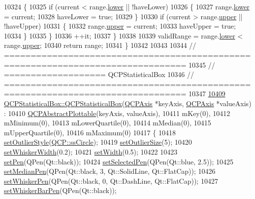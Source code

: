 \begin{DoxyCode}
10324     \{
10325       \textcolor{keywordflow}{if} (current < range.\hyperlink{a00049_aa3aca3edb14f7ca0c85d912647b91745}{lower} || !haveLower)
10326       \{
10327         range.\hyperlink{a00049_aa3aca3edb14f7ca0c85d912647b91745}{lower} = current;
10328         haveLower = \textcolor{keyword}{true};
10329       \}
10330       \textcolor{keywordflow}{if} (current > range.\hyperlink{a00049_ae44eb3aafe1d0e2ed34b499b6d2e074f}{upper} || !haveUpper)
10331       \{
10332         range.\hyperlink{a00049_ae44eb3aafe1d0e2ed34b499b6d2e074f}{upper} = current;
10333         haveUpper = \textcolor{keyword}{true};
10334       \}
10335     \}
10336     ++it;
10337   \}
10338   
10339   validRange = range.\hyperlink{a00049_aa3aca3edb14f7ca0c85d912647b91745}{lower} < range.\hyperlink{a00049_ae44eb3aafe1d0e2ed34b499b6d2e074f}{upper};
10340   \textcolor{keywordflow}{return} range;
10341 \}
10342 
10343 
10344 \textcolor{comment}{// ================================================================================}
10345 \textcolor{comment}{// =================== QCPStatisticalBox}
10346 \textcolor{comment}{// ================================================================================}
10347 
\hypertarget{a00115_source_l10409}{}\hyperlink{a00050_a75c2b3e7fcd0741cc981693a2ba63b27}{10409} \hyperlink{a00050_a75c2b3e7fcd0741cc981693a2ba63b27}{QCPStatisticalBox::QCPStatisticalBox}(\hyperlink{a00025}{QCPAxis} *keyAxis, 
      \hyperlink{a00025}{QCPAxis} *valueAxis) :
10410   \hyperlink{a00024}{QCPAbstractPlottable}(keyAxis, valueAxis),
10411   mKey(0),
10412   mMinimum(0),
10413   mLowerQuartile(0),
10414   mMedian(0),
10415   mUpperQuartile(0),
10416   mMaximum(0)
10417 \{
10418   \hyperlink{a00050_a1cb2469552f6f6615b1f6d7398463e5c}{setOutlierStyle}(\hyperlink{a00143_af66d0711d42fe78d96c28abadc67f26fa13ed43d724ecefa84baae4179de3bd8d}{QCP::ssCircle});
10419   \hyperlink{a00050_ae784a5ea2da652e24445d36fbc0b0854}{setOutlierSize}(5);
10420   \hyperlink{a00050_adf378812446bd66f34d1f7f293d991cd}{setWhiskerWidth}(0.2);
10421   \hyperlink{a00050_a0b62775bd67301b1eba5c785f2b26f14}{setWidth}(0.5);
10422   
10423   \hyperlink{a00024_ab74b09ae4c0e7e13142fe4b5bf46cac7}{setPen}(QPen(Qt::black));
10424   \hyperlink{a00024_a6911603cad23ab0469b108224517516f}{setSelectedPen}(QPen(Qt::blue, 2.5));
10425   \hyperlink{a00050_a7260ac55b669f5d0a74f16d5ca84c52c}{setMedianPen}(QPen(Qt::black, 3, Qt::SolidLine, Qt::FlatCap));
10426   \hyperlink{a00050_a4a5034cb3b9b040444df05ab1684620b}{setWhiskerPen}(QPen(Qt::black, 0, Qt::DashLine, Qt::FlatCap));
10427   \hyperlink{a00050_aa8d3e503897788e1abf68dc74b5f147f}{setWhiskerBarPen}(QPen(Qt::black));

\end{DoxyCode}
